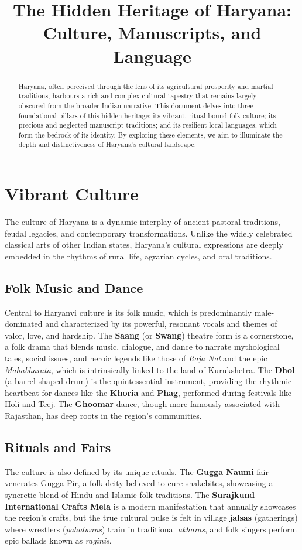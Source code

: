 \documentclass[12pt]{article}
\title{The Hidden Heritage of Haryana: Culture, Manuscripts, and Language}
\author{}
\date{}
\begin{document}
\maketitle

\begin{abstract}
Haryana, often perceived through the lens of its agricultural prosperity and martial traditions, harbours a rich and complex cultural tapestry that remains largely obscured from the broader Indian narrative. This document delves into three foundational pillars of this hidden heritage: its vibrant, ritual-bound folk culture; its precious and neglected manuscript traditions; and its resilient local languages, which form the bedrock of its identity. By exploring these elements, we aim to illuminate the depth and distinctiveness of Haryana's cultural landscape.
\end{abstract}

\section{Vibrant Culture}
The culture of Haryana is a dynamic interplay of ancient pastoral traditions, feudal legacies, and contemporary transformations. Unlike the widely celebrated classical arts of other Indian states, Haryana's cultural expressions are deeply embedded in the rhythms of rural life, agrarian cycles, and oral traditions.

\subsection{Folk Music and Dance}
Central to Haryanvi culture is its folk music, which is predominantly male-dominated and characterized by its powerful, resonant vocals and themes of valor, love, and hardship. The \textbf{Saang} (or \textbf{Swang}) theatre form is a cornerstone, a folk drama that blends music, dialogue, and dance to narrate mythological tales, social issues, and heroic legends like those of \textit{Raja Nal} and the epic \textit{Mahabharata}, which is intrinsically linked to the land of Kurukshetra. The \textbf{Dhol} (a barrel-shaped drum) is the quintessential instrument, providing the rhythmic heartbeat for dances like the \textbf{Khoria} and \textbf{Phag}, performed during festivals like Holi and Teej. The \textbf{Ghoomar} dance, though more famously associated with Rajasthan, has deep roots in the region's communities.

\subsection{Rituals and Fairs}
The culture is also defined by its unique rituals. The \textbf{Gugga Naumi} fair venerates Gugga Pir, a folk deity believed to cure snakebites, showcasing a syncretic blend of Hindu and Islamic folk traditions. The \textbf{Surajkund International Crafts Mela} is a modern manifestation that annually showcases the region's crafts, but the true cultural pulse is felt in village \textbf{jalsas} (gatherings) where wrestlers (\textit{pahalwans}) train in traditional \textit{akharas}, and folk singers perform epic ballads known as \textit{raginis}.
\end{document}
